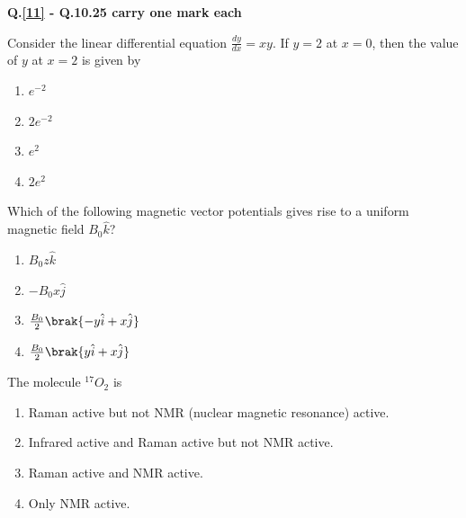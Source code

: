         \item[] \textbf{Q.\ref{11} - Q.10.25 carry one mark each}
    \item \label{11} Consider the linear differential equation $\frac{dy}{dx} = xy$. If $y=2$ at $x=0$, then the value of $y$ at $x=2$ is given by
        \begin{enumerate}
            \item $e^{-2}$
            \item $2e^{-2}$
            \item $e^{2}$
            \item $2e^{2}$
        \end{enumerate}

    \item Which of the following magnetic vector potentials gives rise to a uniform magnetic field $B_0 \hat{k}$?
        \begin{enumerate}
            \item $B_0 z \hat{k}$
            \item $- B_0 x \hat{j}$
            \item $\frac{B_0}{2} \brak{-y \hat{i} + x \hat{j}}$
            \item $\frac{B_0}{2} \brak{y \hat{i} + x \hat{j}}$
        \end{enumerate}

    \item The molecule $^{17}O_2$ is
        \begin{enumerate}
            \item Raman active but not NMR (nuclear magnetic resonance) active.
            \item Infrared active and Raman active but not NMR active.
            \item Raman active and NMR active.
            \item Only NMR active.
        \end{enumerate}

